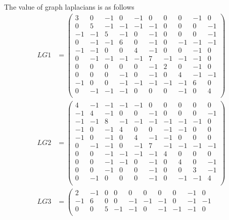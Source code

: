 \documentclass[12pt,a4paper]{article}
\begin{document}
The value of graph laplacians is as follows
\begin{align}
    LG1 &=
    \left(
    \begin{array}{cccccccccc}
     3 & 0 & -1 & 0 & -1 & 0 & 0 & 0 & -1 & 0 \\
     0 & 5 & -1 & -1 & -1 & -1 & 0 & 0 & 0 & -1 \\
     -1 & -1 & 5 & -1 & 0 & -1 & 0 & 0 & 0 & -1 \\
     0 & -1 & -1 & 6 & 0 & -1 & 0 & -1 & -1 & -1 \\
     -1 & -1 & 0 & 0 & 4 & -1 & 0 & 0 & -1 & 0 \\
     0 & -1 & -1 & -1 & -1 & 7 & -1 & -1 & -1 & 0 \\
     0 & 0 & 0 & 0 & 0 & -1 & 2 & 0 & -1 & 0 \\
     0 & 0 & 0 & -1 & 0 & -1 & 0 & 4 & -1 & -1 \\
     -1 & 0 & 0 & -1 & -1 & -1 & -1 & -1 & 6 & 0 \\
     0 & -1 & -1 & -1 & 0 & 0 & 0 & -1 & 0 & 4 \\
    \end{array}
    \right) \\
    LG2 &=
    \left(
    \begin{array}{cccccccccc}
     4 & -1 & -1 & -1 & -1 & 0 & 0 & 0 & 0 & 0 \\
     -1 & 4 & -1 & 0 & 0 & -1 & 0 & 0 & 0 & -1 \\
     -1 & -1 & 8 & -1 & -1 & -1 & -1 & -1 & -1 & 0 \\
     -1 & 0 & -1 & 4 & 0 & 0 & -1 & -1 & 0 & 0 \\
     -1 & 0 & -1 & 0 & 4 & -1 & -1 & 0 & 0 & 0 \\
     0 & -1 & -1 & 0 & -1 & 7 & -1 & -1 & -1 & -1 \\
     0 & 0 & -1 & -1 & -1 & -1 & 4 & 0 & 0 & 0 \\
     0 & 0 & -1 & -1 & 0 & -1 & 0 & 4 & 0 & -1 \\
     0 & 0 & -1 & 0 & 0 & -1 & 0 & 0 & 3 & -1 \\
     0 & -1 & 0 & 0 & 0 & -1 & 0 & -1 & -1 & 4 \\
    \end{array}
    \right) \\
    LG3 &=
    \left(
    \begin{array}{cccccccccc}
     2 & -1 & 0 & 0 & 0 & 0 & 0 & 0 & -1 & 0 \\
     -1 & 6 & 0 & 0 & -1 & -1 & -1 & 0 & -1 & -1 \\
     0 & 0 & 5 & -1 & -1 & 0 & -1 & -1 & -1 & 0 \\

\end{array}
\end{align}
\end{document}
